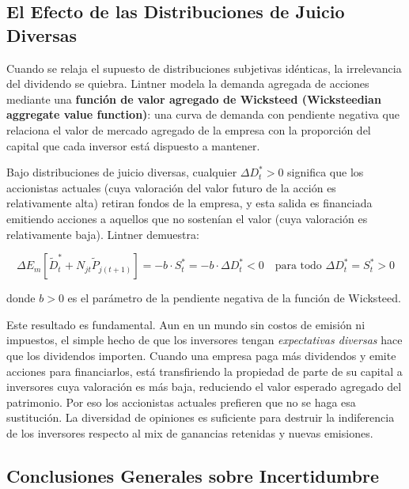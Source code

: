 \documentclass[12pt]{article}
\begin{document}
\subsection{El Efecto de las Distribuciones de Juicio Diversas}

Cuando se relaja el supuesto de distribuciones subjetivas id\'enticas, la irrelevancia del dividendo se quiebra. Lintner modela la demanda agregada de acciones mediante una \textbf{funci\'on de valor agregado de Wicksteed (Wicksteedian aggregate value function)}: una curva de demanda con pendiente negativa que relaciona el valor de mercado agregado de la empresa con la proporci\'on del capital que cada inversor est\'a dispuesto a mantener.

Bajo distribuciones de juicio diversas, cualquier $\Delta D^*_t > 0$ significa que los accionistas actuales (cuya valoraci\'on del valor futuro de la acci\'on es relativamente alta) retiran fondos de la empresa, y esta salida es financiada emitiendo acciones a aquellos que no sosten\'ian el valor (cuya valoraci\'on es relativamente baja). Lintner demuestra:

\begin{equation}
\Delta E_m[\tilde{D}^*_t + N_{jt}\tilde{P}_{j(t+1)}] = -b \cdot S^*_t = -b \cdot \Delta D^*_t < 0 \quad \text{para todo } \Delta D^*_t = S^*_t > 0
\end{equation}

donde $b > 0$ es el par\'ametro de la pendiente negativa de la funci\'on de Wicksteed.

\begin{explicacion}
Este resultado es fundamental. Aun en un mundo sin costos de emisi\'on ni impuestos, el simple hecho de que los inversores tengan \textit{expectativas diversas} hace que los dividendos importen. Cuando una empresa paga m\'as dividendos y emite acciones para financiarlos, est\'a transfiriendo la propiedad de parte de su capital a inversores cuya valoraci\'on es m\'as baja, reduciendo el valor esperado agregado del patrimonio. Por eso los accionistas actuales prefieren que no se haga esa sustituci\'on. La diversidad de opiniones es suficiente para destruir la indiferencia de los inversores respecto al mix de ganancias retenidas y nuevas emisiones.
\end{explicacion}

\subsection{Conclusiones Generales sobre Incertidumbre}
\end{document}
